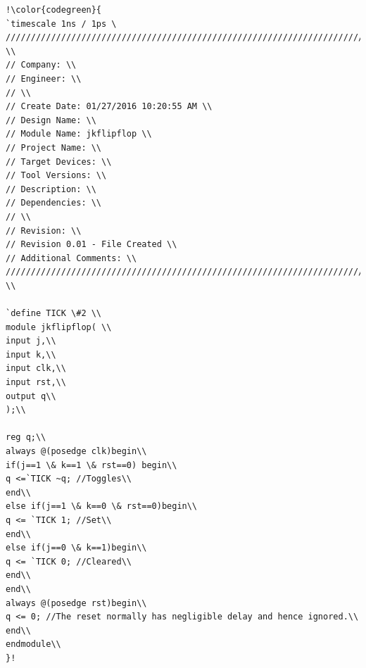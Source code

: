 \documentclass[11pt
  , a4paper
  , article
  , oneside
]{memoir}
\begin{document}
\begin{lstlisting}[style=termstyle, escapechar=!]
!\color{codegreen}{
`timescale 1ns / 1ps \
////////////////////////////////////////////////////////////////////////////////// \\
// Company: \\
// Engineer: \\
// \\
// Create Date: 01/27/2016 10:20:55 AM \\
// Design Name: \\
// Module Name: jkflipflop \\
// Project Name: \\
// Target Devices: \\ 
// Tool Versions: \\
// Description: \\
// Dependencies: \\
// \\
// Revision: \\
// Revision 0.01 - File Created \\
// Additional Comments: \\
////////////////////////////////////////////////////////////////////////////////// \\

`define TICK \#2 \\
module jkflipflop( \\
input j,\\
input k,\\
input clk,\\
input rst,\\
output q\\
);\\

reg q;\\
always @(posedge clk)begin\\
if(j==1 \& k==1 \& rst==0) begin\\
q <=`TICK ~q; //Toggles\\
end\\
else if(j==1 \& k==0 \& rst==0)begin\\
q <= `TICK 1; //Set\\
end\\
else if(j==0 \& k==1)begin\\
q <= `TICK 0; //Cleared\\
end\\
end\\
always @(posedge rst)begin\\
q <= 0; //The reset normally has negligible delay and hence ignored.\\
end\\
endmodule\\
}! 
\end{lstlisting}
\end{document}
